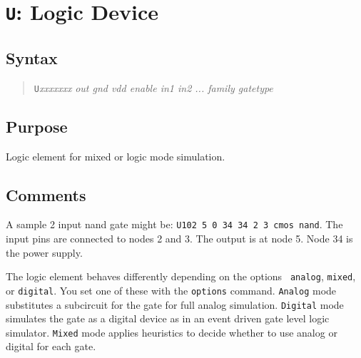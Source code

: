 %
%
%
%
\section{{\tt U}: Logic Device}
\subsection{Syntax}
\begin{verse}
{\tt U}{\it xxxxxxx} {\it out gnd vdd enable in1 in2 ... family gatetype}
\end{verse}
\subsection{Purpose}

Logic element for mixed or logic mode simulation.
\subsection{Comments}

A sample 2 input nand gate might be: {\tt U102 5 0 34 34 2 3 cmos nand}.
The input pins are connected to nodes 2 and 3.  The output is
at node 5.  Node 34 is the power supply.

The logic element behaves differently depending on the options {\tt
analog}, {\tt mixed}, or {\tt digital}.  You set one of these with the
{\tt options} command.  {\tt Analog} mode substitutes a subcircuit for
the gate for full analog simulation.  {\tt Digital} mode simulates the
gate as a digital device as in an event driven gate level logic
simulator.  {\tt Mixed} mode applies heuristics to decide whether to
use analog or digital for each gate.

